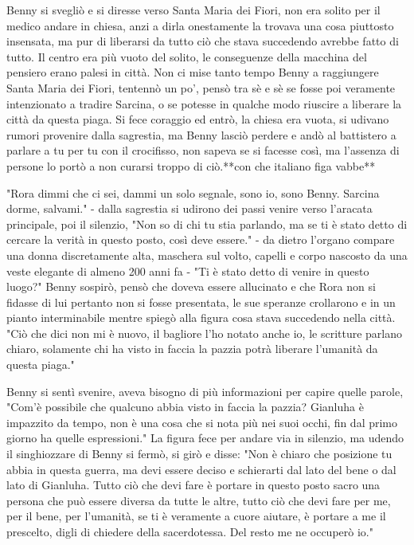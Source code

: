 Benny si svegliò e si diresse verso Santa Maria dei Fiori, non era solito per il medico andare in chiesa, anzi a dirla onestamente la trovava una cosa piuttosto insensata, ma pur di liberarsi da tutto ciò che stava succedendo avrebbe fatto di tutto. Il centro era più vuoto del solito, le conseguenze della macchina del pensiero erano palesi in città. Non ci mise tanto tempo Benny a raggiungere Santa Maria dei Fiori, tentennò un po', pensò tra sè e sè se fosse poi veramente intenzionato a tradire Sarcina, o se potesse in qualche modo riuscire a liberare la città da questa piaga. Si fece coraggio ed entrò, la chiesa era vuota, si udivano rumori provenire dalla sagrestia, ma Benny lasciò perdere e andò al battistero a parlare a tu per tu con il crocifisso, non sapeva se si facesse così, ma l'assenza di persone lo portò a non curarsi troppo di ciò.**con che italiano figa vabbe**

"Rora dimmi che ci sei, dammi un solo segnale, sono io, sono Benny. Sarcina dorme, salvami." - dalla sagrestia si udirono dei passi venire verso l'aracata principale, poi il silenzio, "Non so di chi tu stia parlando, ma se ti è stato detto di cercare la verità in questo posto, così deve essere." - da dietro l'organo compare una donna discretamente alta, maschera sul volto, capelli e corpo nascosto da una veste elegante di almeno 200 anni fa - "Ti è stato detto di venire in questo luogo?" 
Benny sospirò, pensò che doveva essere allucinato e che Rora non si fidasse di lui pertanto non si fosse presentata, le sue speranze crollarono e in un pianto interminabile mentre spiegò alla figura cosa stava succedendo nella città.
"Ciò che dici non mi è nuovo, il bagliore l'ho notato anche io, le scritture parlano chiaro, solamente chi ha visto in faccia la pazzia potrà liberare l'umanità da questa piaga."

Benny si sentì svenire, aveva bisogno di più informazioni per capire quelle parole, "Com'è possibile che qualcuno abbia visto in faccia la pazzia? Gianluha è impazzito da tempo, non è una cosa che si nota più nei suoi occhi, fin dal primo giorno ha quelle espressioni."
La figura fece per andare via in silenzio, ma udendo il singhiozzare di Benny si fermò, si girò e disse: "Non è chiaro che posizione tu abbia in questa guerra, ma devi essere deciso e schierarti dal lato del bene o dal lato di Gianluha. Tutto ciò che devi fare è portare in questo posto sacro una persona che può essere diversa da tutte le altre, tutto ciò che devi fare per me, per il bene, per l'umanità, se ti è veramente a cuore aiutare, è portare a me il prescelto, digli di chiedere della sacerdotessa. Del resto me ne occuperò io."


